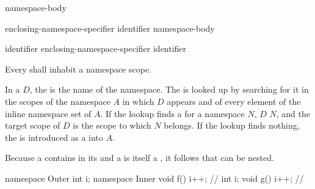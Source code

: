 \begin{bnf}
\br
           \terminal{\{} namespace-body \terminal{\}}
\end{bnf}

\begin{bnf}
\br
         enclosing-namespace-specifier \terminal{::}  identifier \terminal{\{} namespace-body \terminal{\}}
\end{bnf}

\begin{bnf}
\br
        identifier\br
        enclosing-namespace-specifier \terminal{::}  identifier
\end{bnf}

\begin{bnf}
\br
\end{bnf}

\pnum
Every  shall inhabit a namespace scope.

\pnum
In a  $D$,
the  is the name of the namespace.
The  is looked up
by searching for it in the scopes of the namespace $A$
in which $D$ appears
and of every element of the inline namespace set of $A$.
If the lookup finds a  for a namespace $N$,
%
$D$  $N$,
and the target scope of $D$ is the scope to which $N$ belongs.
If the lookup finds nothing, the  is introduced
as a  into $A$.

\pnum
Because a  contains
 in its  and a
 is itself a , it
follows that  can be nested.
\begin{example}
\begin{codeblock}
namespace Outer {
  int i;
  namespace Inner {
    void f() { i++; }           // 
    int i;
    void g() { i++; }           // 
  }
}
\end{codeblock}
\end{example}

